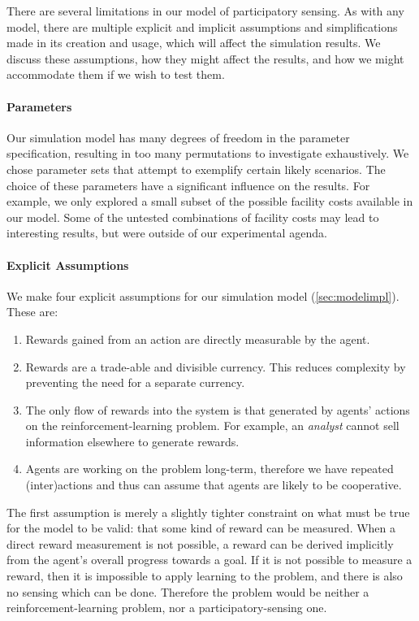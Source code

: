There are several limitations in our model of participatory sensing. As with
any model, there are multiple explicit and implicit assumptions and
simplifications made in its creation and usage, which will affect the
simulation results. We discuss these assumptions, how they might affect the
results, and how we might accommodate them if we wish to test them.

\paragraph{Parameters} Our simulation model has many degrees of freedom in the
parameter specification, resulting in too many permutations to investigate
exhaustively. We chose parameter sets that attempt to exemplify certain likely
scenarios. The choice of these parameters have a significant influence on the
results. For example, we only explored a small subset of the possible facility costs
available in our model. Some of the untested combinations of facility costs may lead to interesting results, but were outside of our experimental agenda.

\paragraph{Explicit Assumptions}
We make four explicit assumptions for our simulation model (\autoref{sec:modelimpl}). These are:
\begin{enumerate}
\item Rewards gained from an action are directly measurable by the agent.
\item Rewards are a trade-able and divisible currency. This reduces complexity by preventing the need for a separate currency.
\item The only flow of rewards into the system is that generated by agents' actions on the reinforcement-learning problem. For example, an \emph{analyst} cannot sell information elsewhere to generate rewards.
\item Agents are working on the problem long-term, therefore we have repeated (inter)actions and thus can assume that agents are likely to be cooperative.
\end{enumerate}

The first assumption is merely a slightly tighter constraint on what must be true
for the model to be valid: that some kind of reward can be measured. When a
direct reward measurement is not possible, a reward can be derived implicitly
from the agent's overall progress towards a goal. If it is not possible to
measure a reward, then it is impossible to apply learning to the problem, and
there is also no sensing which can be done. Therefore the problem would be neither a
reinforcement-learning problem, nor a participatory-sensing one.

